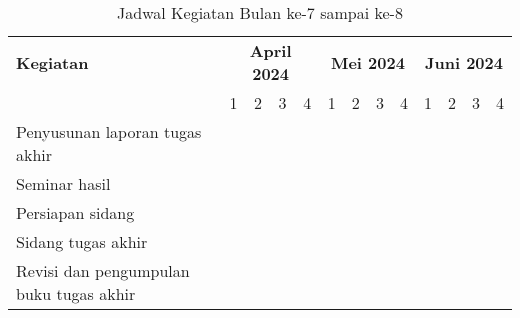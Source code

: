 \begin{table}[ht]
\caption{Jadwal Kegiatan Bulan ke-7 sampai ke-8}
\begin{tabular}{|m{4cm}|*{12}{m{0.4cm}|}}
\hline
\rowcolor{lightgray} %
\textbf{Kegiatan} & \multicolumn{4}{c|}{\textbf{April 2024}} & \multicolumn{4}{c|}{\textbf{Mei 2024}} & \multicolumn{4}{c|}{\textbf{Juni 2024}} \\
\cline{2-13}
\cellcolor{lightgray} & 1 & 2 & 3 & 4 & 1 & 2 & 3 & 4 & 1 & 2 & 3 & 4 \\
\hline
Penyusunan laporan tugas akhir & \cellcolor{blue!25} & \cellcolor{blue!25} & \cellcolor{blue!25} & & & & & & & & & \\
\hline
Seminar hasil & & & & \cellcolor{blue!25} & \cellcolor{blue!25} & & & & & & & \\
\hline
Persiapan sidang & & & & & &  \cellcolor{blue!25} &  \cellcolor{blue!25} & & & & & \\
\hline
Sidang tugas akhir & & & & & & & & \cellcolor{blue!25} & \cellcolor{blue!25}& & & \\
\hline
Revisi dan pengumpulan buku tugas akhir & & & & & & & & & & \cellcolor{blue!25} &  \cellcolor{blue!25} &  \cellcolor{blue!25} \\
\hline
\end{tabular}
\end{table}